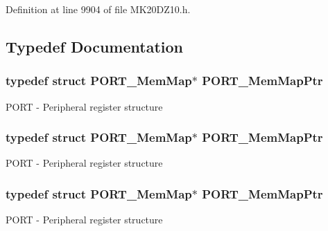 Definition at line 9904 of file M\+K20\+D\+Z10.\+h.



\subsection{Typedef Documentation}
\subsubsection[{\texorpdfstring{P\+O\+R\+T\+\_\+\+Mem\+Map\+Ptr}{PORT_MemMapPtr}}]{\setlength{\rightskip}{0pt plus 5cm}typedef struct {\bf P\+O\+R\+T\+\_\+\+Mem\+Map}$\ast$ {\bf P\+O\+R\+T\+\_\+\+Mem\+Map\+Ptr}}\hypertarget{group___p_o_r_t___peripheral_ga0e26bafb7c17808f90278627bcbcaf8c}{}\label{group___p_o_r_t___peripheral_ga0e26bafb7c17808f90278627bcbcaf8c}
P\+O\+RT -\/ Peripheral register structure 
\subsubsection[{\texorpdfstring{P\+O\+R\+T\+\_\+\+Mem\+Map\+Ptr}{PORT_MemMapPtr}}]{\setlength{\rightskip}{0pt plus 5cm}typedef struct {\bf P\+O\+R\+T\+\_\+\+Mem\+Map}$\ast$ {\bf P\+O\+R\+T\+\_\+\+Mem\+Map\+Ptr}}\hypertarget{group___p_o_r_t___peripheral_ga0e26bafb7c17808f90278627bcbcaf8c}{}\label{group___p_o_r_t___peripheral_ga0e26bafb7c17808f90278627bcbcaf8c}
P\+O\+RT -\/ Peripheral register structure 
\subsubsection[{\texorpdfstring{P\+O\+R\+T\+\_\+\+Mem\+Map\+Ptr}{PORT_MemMapPtr}}]{\setlength{\rightskip}{0pt plus 5cm}typedef struct {\bf P\+O\+R\+T\+\_\+\+Mem\+Map}$\ast$ {\bf P\+O\+R\+T\+\_\+\+Mem\+Map\+Ptr}}\hypertarget{group___p_o_r_t___peripheral_ga0e26bafb7c17808f90278627bcbcaf8c}{}\label{group___p_o_r_t___peripheral_ga0e26bafb7c17808f90278627bcbcaf8c}
P\+O\+RT -\/ Peripheral register structure 